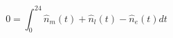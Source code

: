 \begin{equation}
0 = \int_{0}^{24}\hat{n}_m(t) + \hat{n}_l(t) - \hat{n}_e(t) dt
\label{ch4:equ:normal-distribution-balance}
\end{equation}

